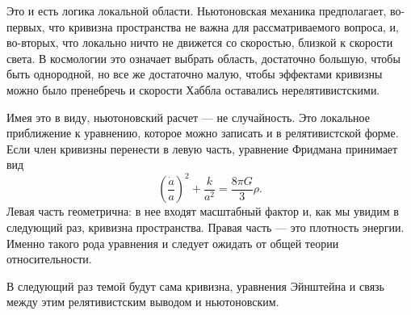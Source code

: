 Это и есть логика локальной области. Ньютоновская механика предполагает, во-первых, что кривизна пространства не важна для рассматриваемого вопроса, и, во-вторых, что локально ничто не движется со скоростью, близкой к скорости света. В космологии это означает выбрать область, достаточно большую, чтобы быть однородной, но все же достаточно малую, чтобы эффектами кривизны можно было пренебречь и скорости Хаббла оставались нерелятивистскими.

Имея это в виду, ньютоновский расчет — не случайность. Это локальное приближение к уравнению, которое можно записать и в релятивистской форме. Если член кривизны перенести в левую часть, уравнение Фридмана принимает вид
\begin{equation}
\left(\frac{\dot a}{a}\right)^2+\frac{k}{a^2}=\frac{8\pi G}{3}\rho.
\end{equation}
Левая часть геометрична: в нее входят масштабный фактор и, как мы увидим в следующий раз, кривизна пространства. Правая часть — это плотность энергии. Именно такого рода уравнения и следует ожидать от общей теории относительности.

В следующий раз темой будут сама кривизна, уравнения Эйнштейна и связь между этим релятивистским выводом и ньютоновским.